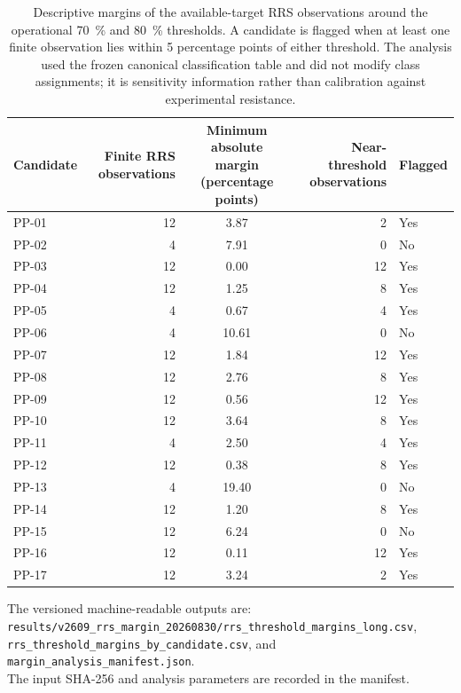 \begin{table}[htbp]
\centering
\scriptsize
\caption{Descriptive margins of the available-target RRS observations around the operational \qty{70}{\percent} and \qty{80}{\percent} thresholds. A candidate is flagged when at least one finite observation lies within 5 percentage points of either threshold. The analysis used the frozen canonical classification table and did not modify class assignments; it is sensitivity information rather than calibration against experimental resistance.}
\label{tab:s18_rrs_margin_sensitivity}
\begin{tabularx}{\textwidth}{l r S[table-format=2.2] r l}
\toprule
Candidate & {Finite RRS observations} & {Minimum absolute margin (percentage points)} & {Near-threshold observations} & {Flagged} \\
\midrule
PP-01 & 12 & 3.87 & 2 & Yes \\
PP-02 & 4 & 7.91 & 0 & No \\
PP-03 & 12 & 0.00 & 12 & Yes \\
PP-04 & 12 & 1.25 & 8 & Yes \\
PP-05 & 4 & 0.67 & 4 & Yes \\
PP-06 & 4 & 10.61 & 0 & No \\
PP-07 & 12 & 1.84 & 12 & Yes \\
PP-08 & 12 & 2.76 & 8 & Yes \\
PP-09 & 12 & 0.56 & 12 & Yes \\
PP-10 & 12 & 3.64 & 8 & Yes \\
PP-11 & 4 & 2.50 & 4 & Yes \\
PP-12 & 12 & 0.38 & 8 & Yes \\
PP-13 & 4 & 19.40 & 0 & No \\
PP-14 & 12 & 1.20 & 8 & Yes \\
PP-15 & 12 & 6.24 & 0 & No \\
PP-16 & 12 & 0.11 & 12 & Yes \\
PP-17 & 12 & 3.24 & 2 & Yes \\
\bottomrule
\end{tabularx}
\end{table}

\noindent The versioned machine-readable outputs are:\\ 
\quad\texttt{results/v2609\_rrs\_margin\_20260830/rrs\_threshold\_margins\_long.csv},\\ 
\quad\texttt{rrs\_threshold\_margins\_by\_candidate.csv}, and\\ 
\quad\texttt{margin\_analysis\_manifest.json}.\\ 
The input SHA-256 and analysis parameters are recorded in the manifest.

